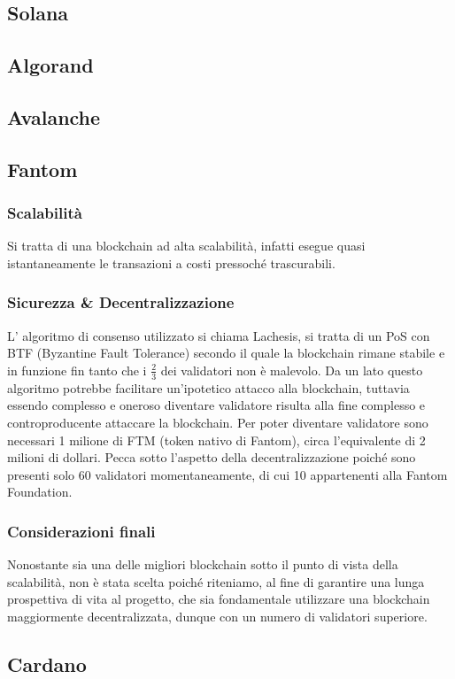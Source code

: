 \documentclass[a4paper, 12pt]{article}
\begin{document}
\subsection*{Solana}
\subsection*{Algorand}
\subsection*{Avalanche}
\subsection*{Fantom}
\subsubsection*{Scalabilità}
Si tratta di una blockchain ad alta scalabilità, infatti esegue quasi istantaneamente le transazioni a costi pressoché trascurabili.
\subsubsection*{Sicurezza \& Decentralizzazione}
L' algoritmo di consenso utilizzato si chiama Lachesis, si tratta di un PoS con BTF (Byzantine Fault Tolerance) secondo il quale la blockchain rimane stabile e in funzione fin tanto che i $\frac{2}{3}$ dei validatori non è malevolo.
Da un lato questo algoritmo potrebbe facilitare un'ipotetico attacco alla blockchain, tuttavia essendo complesso e oneroso diventare validatore risulta alla fine complesso e controproducente attaccare la blockchain.
Per poter diventare validatore sono necessari 1 milione di FTM (token nativo di Fantom), circa l’equivalente di 2 milioni di dollari.
Pecca sotto l’aspetto della decentralizzazione poiché sono presenti solo 60 validatori momentaneamente, di cui 10 appartenenti alla Fantom Foundation.
\subsubsection*{Considerazioni finali}
Nonostante sia una delle migliori blockchain sotto il punto di vista della scalabilità, non è stata scelta poiché riteniamo, al fine di garantire una lunga prospettiva di vita al progetto, che sia fondamentale utilizzare una blockchain maggiormente decentralizzata, dunque con un numero di validatori superiore.
\subsection*{Cardano}
\end{document}
